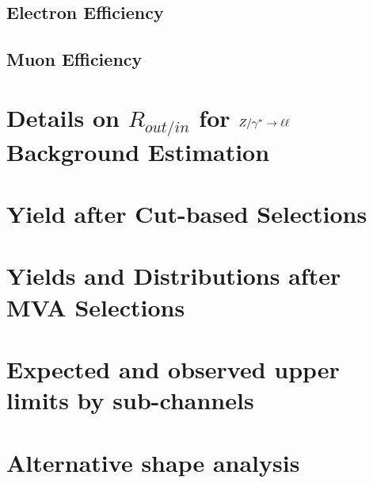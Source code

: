 \documentclass{cmspaper}
\begin{document}
     \subsection{Electron Efficiency}
     \subsection{Muon Efficiency}

\clearpage 

\section{ Details on $R_{out/in}$ for $Z/\gamma^*\to\ell\ell$ Background Estimation}
     \label{app:appendix_dyr}
\clearpage




\clearpage 

  \section{Yield after Cut-based Selections}
     \label{app:appendix_cutresults}
\clearpage

  \section{Yields and Distributions after MVA Selections}
     \label{app:appendix_bdtresults}

\clearpage

  \section{Expected and observed upper limits by sub-channels}
     \label{app:subchannels}

\clearpage
  \section{Alternative shape analysis}
     \label{app:appendix_altshape}
\end{document}
